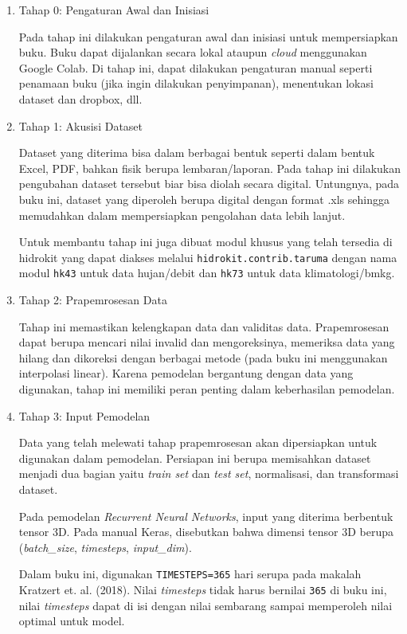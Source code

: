 \documentclass[11pt]{article}
\begin{document}
\begin{enumerate}
\def\labelenumi{\arabic{enumi}.}
\item
  Tahap 0: Pengaturan Awal dan Inisiasi

  Pada tahap ini dilakukan pengaturan awal dan inisiasi untuk
  mempersiapkan buku. Buku dapat dijalankan secara lokal ataupun
  \emph{cloud} menggunakan Google Colab. Di tahap ini, dapat dilakukan
  pengaturan manual seperti penamaan buku (jika ingin dilakukan
  penyimpanan), menentukan lokasi dataset dan dropbox, dll.
\item
  Tahap 1: Akusisi Dataset

  Dataset yang diterima bisa dalam berbagai bentuk seperti dalam bentuk
  Excel, PDF, bahkan fisik berupa lembaran/laporan. Pada tahap ini
  dilakukan pengubahan dataset tersebut biar bisa diolah secara digital.
  Untungnya, pada buku ini, dataset yang diperoleh berupa digital dengan
  format .xls sehingga memudahkan dalam mempersiapkan pengolahan data
  lebih lanjut.

  Untuk membantu tahap ini juga dibuat modul khusus yang telah tersedia
  di hidrokit yang dapat diakses melalui
  \texttt{hidrokit.contrib.taruma} dengan nama modul \texttt{hk43} untuk
  data hujan/debit dan \texttt{hk73} untuk data klimatologi/bmkg.
\item
  Tahap 2: Prapemrosesan Data

  Tahap ini memastikan kelengkapan data dan validitas data.
  Prapemrosesan dapat berupa mencari nilai invalid dan mengoreksinya,
  memeriksa data yang hilang dan dikoreksi dengan berbagai metode (pada
  buku ini menggunakan interpolasi linear). Karena pemodelan bergantung
  dengan data yang digunakan, tahap ini memiliki peran penting dalam
  keberhasilan pemodelan.
\item
  Tahap 3: Input Pemodelan

  Data yang telah melewati tahap prapemrosesan akan dipersiapkan untuk
  digunakan dalam pemodelan. Persiapan ini berupa memisahkan dataset
  menjadi dua bagian yaitu \emph{train set} dan \emph{test set},
  normalisasi, dan transformasi dataset.

  Pada pemodelan \emph{Recurrent Neural Networks}, input yang diterima
  berbentuk tensor 3D. Pada manual Keras, disebutkan bahwa dimensi
  tensor 3D berupa (\emph{batch\_size}, \emph{timesteps},
  \emph{input\_dim}).

  Dalam buku ini, digunakan \texttt{TIMESTEPS=365} hari serupa pada
  makalah Kratzert et. al. (2018). Nilai \emph{timesteps} tidak harus
  bernilai \texttt{365} di buku ini, nilai \emph{timesteps} dapat di isi
  dengan nilai sembarang sampai memperoleh nilai optimal untuk model.


\end{enumerate}
\end{document}
